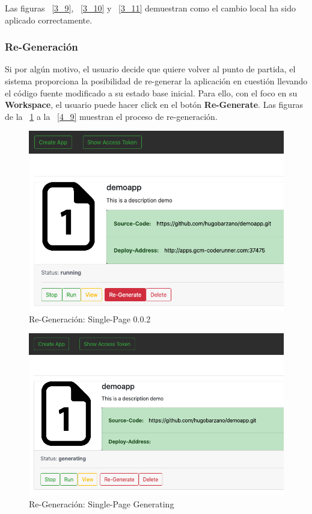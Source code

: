 \documentclass[a4paper,11pt]{book}
\begin{document}
Las figuras ~\ref{3_9},  ~\ref{3_10}  y  ~\ref{3_11} demuestran como el cambio local ha sido aplicado correctamente.


\subsubsection{Re-Generación}

Si por algún motivo, el usuario decide que quiere volver al punto de partida, el sistema proporciona la posibilidad de re-generar la aplicación en cuestión llevando el código fuente modificado a su estado base inicial. Para ello, con el foco en su \textbf{Workspace}, el usuario puede hacer click en el botón \textbf{Re-Generate}. Las figuras de la ~\ref{4_1}  a la ~\ref{4_9} muestran el proceso de re-generación. 

 \begin{figure}[H]
\centering
\includegraphics[scale=0.4]{imagenes/casouso_a/4_1.png}
\caption{  Re-Generación: Single-Page 0.0.2 }
\label{4_1}
\end{figure}


\begin{figure}[H]
\centering
\includegraphics[scale=0.4]{imagenes/casouso_a/4_3.png}
\caption{ Re-Generación: Single-Page Generating  }
\label{4_3}
\end{figure}
\end{document}
